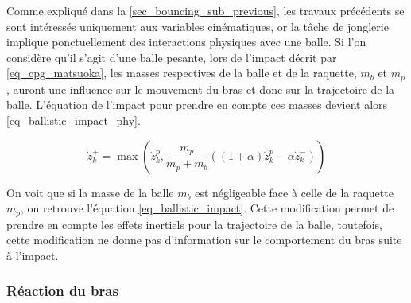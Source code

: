 \documentclass[12pt, a4paper]{article} %
\numberwithin{equation}{section}
\begin{document}
Comme expliqué dans la \cref{sec_bouncing_sub_previous}, les travaux précédents se sont intéressés uniquement aux variables cinématiques, or la tâche de jonglerie implique ponctuellement des interactions physiques avec une balle. Si l'on considère qu'il s'agit d'une balle pesante, lors de l'impact décrit par \cref{eq_cpg_matsuoka}, les masses respectives de la balle et de la raquette, $ m_b $ et $ m_p $, auront une influence sur le mouvement du bras et donc sur la trajectoire de la balle. L'équation de l'impact pour prendre en compte ces masses devient alors \cref{eq_ballistic_impact_phy}.

\begin{equation} \label{eq_ballistic_impact_phy}
\dot{z}^+_{k} = \max\left(\dot{z}^p_k, \frac{m_p}{m_p+m_b}\left((1+\alpha)\dot{z}^p_k-\alpha\dot{z}_{k}^-\right)\right)
\end{equation}

On voit que si la masse de la balle $ m_b $ est négligeable face à celle de la raquette $ m_p $, on retrouve l'équation \cref{eq_ballistic_impact}. Cette modification permet de prendre en compte les effets inertiels pour la trajectoire de la balle, toutefois, cette modification ne donne pas d'information sur le comportement du bras suite à l'impact.

\subsubsection{Réaction du bras}  \label{sec_bouncing_sub_interactions_sub_arm}
\end{document}
